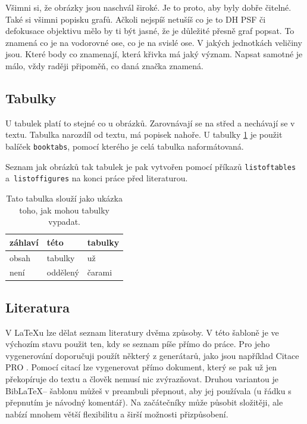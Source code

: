 \documentclass[12pt, a4paper,
 twoside,        %
 openright
]{report}
\begin{document}
Všimni si, že obrázky jsou naschvál široké. Je to proto, aby byly dobře čitelné. Také si všimni popisku grafů. Ačkoli nejspíš netušíš co je to DH PSF či defokusace objektivu mělo by ti být jasné, že je důležité přesně graf popsat. To znamená co je na vodorovné ose, co je na svislé ose. V jakých jednotkách veličiny jsou. Které body co znamenají, která křivka má jaký význam. Napsat samotné \uv{$\Delta \varphi$} je málo, vždy raději připoměň, co daná značka znamená.

\subsection{Tabulky}

U tabulek platí to stejné co u obrázků. Zarovnávají se na střed a nechávají se  v textu. Tabulka narozdíl od textu, má popisek nahoře. U tabulky \ref{tab:ukazka} je použit balíček \texttt{booktabs}, pomocí kterého je celá tabulka naformátovaná.

Seznam jak obrázků tak tabulek je pak vytvořen pomocí příkazů \texttt{listoftables} a~\texttt{list\-of\-fig\-ures} na konci práce před literaturou.

\begin{table}[b]
    \caption{Tato tabulka slouží jako ukázka toho, jak mohou tabulky vypadat.} %
    \label{tab:ukazka} %
    \centering
        \begin{tabular}{lll}
            \toprule %
            záhlaví& této & tabulky\\
            \midrule
            obsah&tabulky& už\\
            není & oddělený &čarami\\
            \bottomrule
        \end{tabular}
\end{table}

\subsection{Literatura}

V \LaTeX{}u lze dělat seznam literatury dvěma způsoby. V této šabloně je ve výchozím stavu použit ten, kdy se seznam píše přímo do práce. Pro jeho vygenerování doporučuji použít některý z generátarů, jako jsou například Citace PRO \cite{citacePRO}. Pomocí citací lze vygenerovat přímo dokument, který se pak už jen překopíruje do textu a člověk nemusí nic zvýrazňovat. Druhou variantou je Bib\LaTeX -- šablonu můžeš v preambuli přepnout, aby jej používala (u řádku s přepnutím je návodný komentář). Na začátečníky může působit složitěji, ale nabízí mnohem větší flexibilitu a širší možnosti přizpůsobení.
\end{document}
